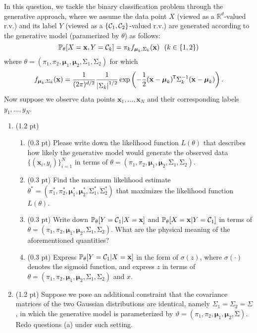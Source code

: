 \documentclass{article}
\newcommand{\real}{\mathbb{R}}
\newcommand*{\tran}{^{\mkern-1.5mu\mathsf{T}}}
\def\vecx{{\mathbf x}}
\def\vecmu{{\boldsymbol \mu}}
\def\matSigma{{\mathbf{\mathrm{\Sigma}}}}
\def\real{{\mathbb {R}}}
\def\prob{\mathbb{P}}
\def\calC{{\cal C}}
\begin{document}
In this question, we tackle the binary classification problem through the generative approach, where we assume the data point $X$ (viewed as a $\real^d$-valued r.v.) and its label $Y$ (viewed as a $\{\calC_1,\calC_2\}$-valued r.v.) are generated according to the generative model (paramerized by $\theta$) as follows:
\begin{equation}\label{eq:two_gaussian}
\prob_\theta [X = \vecx,Y = \calC_k] = \pi_k f_{\vecmu_k,\matSigma_k}(\vecx)~~ (k \in \{1,2\})
\end{equation}
%
where $\theta = (\pi_1,\pi_2,\vecmu_1,\vecmu_2,\matSigma_1,\matSigma_2)$ for which
\begin{equation*}
f_{\vecmu_k,\matSigma_k}(\vecx) = \frac{1}{(2\pi)^{d/2}}\frac{1}{\left| \matSigma_k \right|^{1/2}}\exp\left(-\frac{1}{2}(\vecx-\vecmu_k)\tran \matSigma_k^{-1}(\vecx-\vecmu_k)\right).
\end{equation*}
%
Now suppose we observe data points $\vecx_1,...,\vecx_N$ and their corresponding labels $y_1,...,y_N$.
\begin{enumerate}[label=(\alph*)]
\item (1.2 pt)
\begin{enumerate}[label=(\roman*)]
\item (0.3 pt) Please write down the likelihood function $L(\theta)$ that describes how likely the generative model would generate the observed data $\{(\vecx_i,y_i)\}_{i=1}^N$ in terms of $\theta = (\pi_1,\pi_2,\vecmu_1,\vecmu_2,\matSigma_1,\matSigma_2)$.
%
\item (0.3 pt) Find the maximum likelihood estimate $\theta^* = (\pi^*_1,\pi^*_2,\vecmu^*_1,\vecmu^*_2,\matSigma^*_1,\matSigma^*_2)$ that maximizes the likelihood function $L(\theta)$. %
%
\item (0.3 pt) Write down $\prob_\theta[Y=\calC_1|X=\vecx]$ and $\prob_\theta[X=\vecx|Y=\calC_1]$ in terms of $\theta = (\pi_1,\pi_2,\vecmu_1,\vecmu_2,\matSigma_1,\matSigma_2)$. What are the physical meaning of the aforementioned quantities?
%
\item (0.3 pt) Express $\prob_\theta[Y=\calC_1|X=\vecx]$ in the form of $\sigma(z)$, where $\sigma(\cdot)$ denotes the sigmoid function, and express $z$ in terms of $\theta = (\pi_1,\pi_2,\vecmu_1,\vecmu_2,\matSigma_1,\matSigma_2)$ and $x$.
\end{enumerate}
%
\item (1.2 pt) Suppose we pose an additional constraint that the covariance matrices of the two Gaussian distributions are identical, namely $\Sigma_1=\Sigma_2=\Sigma$, in which the generative model is parameterized by $\vartheta = (\pi_1,\pi_2,\vecmu_1,\vecmu_2,\matSigma)$. Redo questions (a) under such setting.
\end{enumerate}
\end{document}
